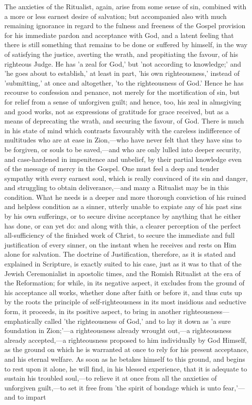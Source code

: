 \documentclass[
]{book}
\begin{document}
The anxieties of the Ritualist, again, arise from some sense of sin, combined with a more or less earnest desire of salvation; but accompanied also with much remaining ignorance in regard to the fulness and freeness of the Gospel provision for his immediate pardon and acceptance with God, and a latent feeling that there is still something that remains to be done or suffered by himself, in the way of satisfying the justice, averting the wrath, and propitiating the favour, of his righteous Judge. He has 'a zeal for God,' but 'not according to knowledge;' and 'he goes about to establish,' at least in part, 'his own righteousness,' instead of 'submitting,' at once and altogether, 'to the righteousness of God.' Hence he has recourse to confession and penance, not merely for the mortification of sin, but for relief from a sense of unforgiven guilt; and hence, too, his zeal in almsgiving and good works, not as expressions of gratitude for grace received, but as a means of deprecating the wrath, and securing the favour, of God. There is much in his state of mind which contrasts favourably with the careless indifference of multitudes who are at ease in Zion,---who have never felt that they have sins to be forgiven, or souls to be saved,---and who are only lulled into deeper security, and case-hardened in impenitence and unbelief, by their partial knowledge even of the message of mercy in the Gospel. One must feel a deep and tender sympathy with every earnest soul, which is really convinced of its sin and danger, and struggling to obtain deliverance,---and many a Ritualist may be in this condition. What he needs is a deeper and more thorough conviction of his ruined and helpless condition as a sinner, utterly unable to expiate any of his past sins by his own sufferings, or to secure divine acceptance by anything that he either has done, or can yet do: and along with this, a clearer perception of the perfect all-sufficiency of the finished work of Christ, to secure the immediate and full justification of every sinner, on the instant when he receives and rests on Him alone for salvation. The doctrine of Justification, therefore, as it is stated and explained in Scripture, is exactly suited to his case, just as it was to that of the Jewish Ceremonialist in apostolic times, and the Romish Ritualist at the era of the Reformation; for while, in its negative aspect, it excludes from the ground of his acceptance all works, whether done after faith or before it, and thus cuts up by the roots the principle of self-righteousness in its most insidious and seductive form, it proceeds, in its positive aspect, to bring in another righteousness---emphatically called 'the righteousness of God,' and to lay it down as 'a sure foundation in Zion;'---a righteousness already wrought out,---a righteousness already accepted,---a righteousness proposed to him individually by God Himself, as the ground on which he is warranted at once to rely for his present acceptance, and his eternal welfare. As soon as he betakes himself to this ground, and begins to rest upon it alone, he will find, in his blessed experience, that it is adequate to sustain his troubled soul,---to relieve it at once from all the anxieties of unforgiven guilt,---to set it free from 'the spirit of bondage which is unto fear,'---and to impart 
\end{document}
